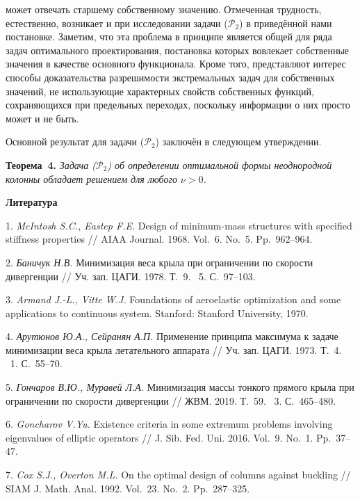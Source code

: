 может отвечать старшему собственному значению.
%
%
%
Отмеченная трудность, естественно, возникает и при исследовании задачи
($\mathcal{P}_2$) в приведённой нами постановке.
%
%
%
Заметим, что эта проблема в принципе является общей для ряда задач оптимального проектирования,
постановка которых вовлекает собственные значения в качестве основного функционала.
%
%
%
Кроме того,
представляют интерес способы доказательства разрешимости
экстремальных задач для собственных значений,
не использующие характерных свойств собственных функций,
сохраняющихся при предельных переходах,
поскольку информации о них просто может и не быть.
%
%
%
%
%
\par
Основной результат для задачи ($\mathcal{P}_2$) заключён в
следующем утверждении.

\textbf{Теорема~4.} {\it Задача \emph{($\mathcal{P}_2$)} об определении оптимальной формы неоднородной колонны обладает решением для любого $\nu > 0$.}
%
%
%
\par



\smallskip \centerline {\bf Литература} \nopagebreak

1. {\it McIntosh S.C., Eastep F.E.}
Design of minimum-mass structures with specified stiffness properties
// AIAA Journal. 1968. Vol.~6. No.~5. Pp.~962\nobreakdash--964.

2. {\it Баничук Н.В.}
Минимизация веса крыла при ограничении по скорости дивергенции
// Уч. зап. ЦАГИ. 1978. Т.~9. \textnumero~5. С.~97\nobreakdash--103.

3. {\it Armand J.-L., Vitte W.J.}
Foundations of aeroelastic
\linebreak
optimization and some applications to continuous system.
\linebreak
Stanford: Stanford University, 1970.


4. {\it Арутюнов Ю.А., Сейранян А.П.}
Применение принципа максимума к задаче минимизации веса крыла
летательного аппарата
// Уч. зап. ЦАГИ. 1973. Т.~4. \textnumero~1. С.~55\nobreakdash--70.


5. {\it Гончаров В.Ю., Муравей Л.А.}
Минимизация массы тонкого прямого крыла при ограничении по скорости дивергенции
// ЖВМ. 2019. Т.~59. \textnumero~3. С.~465\nobreakdash--480.

6. {\it Goncharov V.Yu.}
Existence criteria in some extremum problems involving eigenvalues of elliptic operators
// J. Sib. Fed. Uni. 2016. Vol.~9. No.~1. Pp.~37\nobreakdash--47.

7. {\it Cox S.J., Overton M.L.}
On the optimal design of columns against buckling
// SIAM J. Math. Anal. 1992. Vol.~23. No.~2. Pp.~287\nobreakdash--325.
